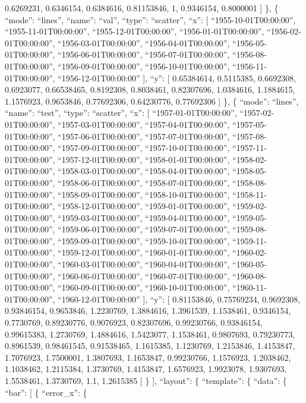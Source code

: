 \documentclass[
]{article}
\begin{document}
0.6269231, 0.6346154, 0.6384616, 0.81153846, 1, 0.9346154, 0.8000001 {]}
\}, \{ ``mode'': ``lines'', ``name'': ``val'', ``type'': ``scatter'',
``x'': {[} ``1955-10-01T00:00:00'', ``1955-11-01T00:00:00'',
``1955-12-01T00:00:00'', ``1956-01-01T00:00:00'',
``1956-02-01T00:00:00'', ``1956-03-01T00:00:00'',
``1956-04-01T00:00:00'', ``1956-05-01T00:00:00'',
``1956-06-01T00:00:00'', ``1956-07-01T00:00:00'',
``1956-08-01T00:00:00'', ``1956-09-01T00:00:00'',
``1956-10-01T00:00:00'', ``1956-11-01T00:00:00'',
``1956-12-01T00:00:00'' {]}, ``y'': {[} 0.65384614, 0.5115385,
0.6692308, 0.6923077, 0.66538465, 0.8192308, 0.8038461, 0.82307696,
1.0384616, 1.1884615, 1.1576923, 0.9653846, 0.77692306, 0.64230776,
0.77692306 {]} \}, \{ ``mode'': ``lines'', ``name'': ``test'', ``type'':
``scatter'', ``x'': {[} ``1957-01-01T00:00:00'',
``1957-02-01T00:00:00'', ``1957-03-01T00:00:00'',
``1957-04-01T00:00:00'', ``1957-05-01T00:00:00'',
``1957-06-01T00:00:00'', ``1957-07-01T00:00:00'',
``1957-08-01T00:00:00'', ``1957-09-01T00:00:00'',
``1957-10-01T00:00:00'', ``1957-11-01T00:00:00'',
``1957-12-01T00:00:00'', ``1958-01-01T00:00:00'',
``1958-02-01T00:00:00'', ``1958-03-01T00:00:00'',
``1958-04-01T00:00:00'', ``1958-05-01T00:00:00'',
``1958-06-01T00:00:00'', ``1958-07-01T00:00:00'',
``1958-08-01T00:00:00'', ``1958-09-01T00:00:00'',
``1958-10-01T00:00:00'', ``1958-11-01T00:00:00'',
``1958-12-01T00:00:00'', ``1959-01-01T00:00:00'',
``1959-02-01T00:00:00'', ``1959-03-01T00:00:00'',
``1959-04-01T00:00:00'', ``1959-05-01T00:00:00'',
``1959-06-01T00:00:00'', ``1959-07-01T00:00:00'',
``1959-08-01T00:00:00'', ``1959-09-01T00:00:00'',
``1959-10-01T00:00:00'', ``1959-11-01T00:00:00'',
``1959-12-01T00:00:00'', ``1960-01-01T00:00:00'',
``1960-02-01T00:00:00'', ``1960-03-01T00:00:00'',
``1960-04-01T00:00:00'', ``1960-05-01T00:00:00'',
``1960-06-01T00:00:00'', ``1960-07-01T00:00:00'',
``1960-08-01T00:00:00'', ``1960-09-01T00:00:00'',
``1960-10-01T00:00:00'', ``1960-11-01T00:00:00'',
``1960-12-01T00:00:00'' {]}, ``y'': {[} 0.81153846, 0.75769234,
0.9692308, 0.93846154, 0.9653846, 1.2230769, 1.3884616, 1.3961539,
1.1538461, 0.9346154, 0.7730769, 0.89230776, 0.9076923, 0.82307696,
0.99230766, 0.93846154, 0.99615383, 1.2730769, 1.4884616, 1.5423077,
1.1538461, 0.9807693, 0.79230773, 0.8961539, 0.98461545, 0.91538465,
1.1615385, 1.1230769, 1.2153846, 1.4153847, 1.7076923, 1.7500001,
1.3807693, 1.1653847, 0.99230766, 1.1576923, 1.2038462, 1.1038462,
1.2115384, 1.3730769, 1.4153847, 1.6576923, 1.9923078, 1.9307693,
1.5538461, 1.3730769, 1.1, 1.2615385 {]} \} {]}, ``layout'': \{
``template'': \{ ``data'': \{ ``bar'': {[} \{ ``error\_x'': \{
\end{document}
